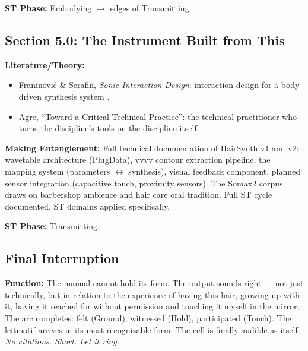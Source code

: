 \noindent\textbf{ST Phase:} Embodying $\to$ edges of Transmitting.

\medskip

\subsection*{Section 5.0: The Instrument Built from This}

\noindent\textbf{Literature/Theory:}
\begin{itemize}[noitemsep]
    \item Franinović \& Serafin, \textit{Sonic Interaction Design}: interaction design for a body-driven synthesis system \parencite{Franinovic_Serafin_2013}.
    \item Agre, ``Toward a Critical Technical Practice'': the technical practitioner who turns the discipline's tools on the discipline itself \parencite{Agre_1998}.
\end{itemize}

\noindent\textbf{Making Entanglement:} Full technical documentation of HairSynth v1 and v2: wavetable architecture (PlugData), vvvv contour extraction pipeline, the mapping system (parameters $\leftrightarrow$ synthesis), visual feedback component, planned sensor integration (capacitive touch, proximity sensors). The Somax2 corpus draws on barbershop ambience and hair care oral tradition. Full ST cycle documented. ST domains applied specifically.

\noindent\textbf{ST Phase:} Transmitting.

\medskip

\subsection*{Final Interruption}

\noindent\textbf{Function:} The manual cannot hold its form. The output sounds right — not just technically, but in relation to the experience of having this hair, growing up with it, having it reached for without permission and touching it myself in the mirror. The arc completes: felt (Ground), witnessed (Hold), participated (Touch). The leitmotif arrives in its most recognizable form. The cell is finally audible as itself. \textit{No citations. Short. Let it ring.}

\bigskip


